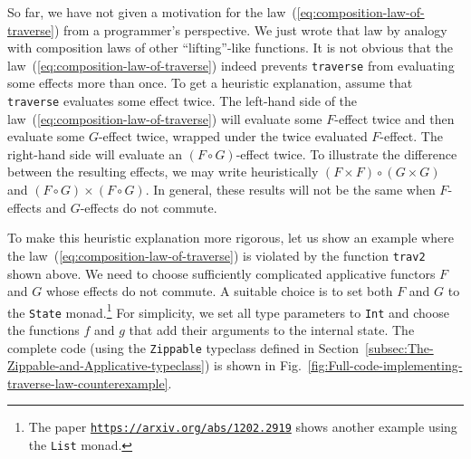 So far, we have not given a motivation for the law~(\ref{eq:composition-law-of-traverse})
from a programmer\textsf{'}s perspective. We just wrote that law by analogy
with composition laws of other \textsf{``}lifting\textsf{''}-like functions. It is
not obvious that the law~(\ref{eq:composition-law-of-traverse})
indeed prevents \lstinline!traverse! from evaluating some effects
more than once. To get a heuristic explanation, assume that \lstinline!traverse!
evaluates some effect twice. The left-hand side of the law~(\ref{eq:composition-law-of-traverse})
will evaluate some $F$-effect twice and then evaluate some $G$-effect
twice, wrapped under the twice evaluated $F$-effect. The right-hand
side will evaluate an $(F\circ G)$-effect twice. To illustrate the
difference between the resulting effects, we may write heuristically
$(F\times F)\circ(G\times G)$ and $(F\circ G)\times(F\circ G)$.
In general, these results will not be the same when $F$-effects and
$G$-effects do not commute.

To make this heuristic explanation more rigorous, let us show an example
where the law~(\ref{eq:composition-law-of-traverse}) is violated
by the function \lstinline!trav2! shown above. We need to choose
sufficiently complicated applicative functors $F$ and $G$ whose
effects do not commute. A suitable choice is to set both $F$ and
$G$ to the \lstinline!State! monad.\footnote{The paper \texttt{\href{https://arxiv.org/abs/1202.2919}{https://arxiv.org/abs/1202.2919}}
shows another example using the \lstinline!List! monad.} For simplicity, we set all type parameters to \lstinline!Int! and
choose the functions $f$ and $g$ that add their arguments to the
internal state. The complete code (using the \lstinline!Zippable!
typeclass defined in Section~\ref{subsec:The-Zippable-and-Applicative-typeclass})
is shown in Fig.~\ref{fig:Full-code-implementing-traverse-law-counterexample}.

